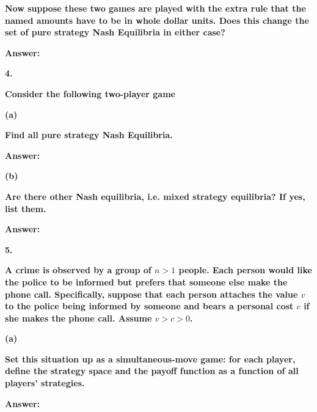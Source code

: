 \documentclass[letterpaper,11pt]{article}
\begin{document}
\textbf{Now suppose these two games are played with the extra rule that the named amounts have to be in whole dollar units. Does this change the set of pure strategy Nash Equilibria in either case?
}\par
\bigbreak
\begin{addmargin}[-0.5em]{0em}
\textbf{Answer: }\end{addmargin}





\begin{addmargin}[-2em]{0em} \large{\textbf{4. }}\end{addmargin}
\textbf{Consider the following two-player game}




\begin{addmargin}[-1.1em]{0em}
\textbf{(a)}\par\end{addmargin}
\textbf{Find all pure strategy Nash Equilibria.}
\bigbreak
\begin{addmargin}[-0.5em]{0em}
\textbf{Answer: }\end{addmargin}


\begin{addmargin}[-1.1em]{0em}
\textbf{(b)}\par\end{addmargin}
\textbf{Are there other Nash equilibria, i.e. mixed strategy equilibria? If yes, list them.
}\par
\bigbreak
\begin{addmargin}[-0.5em]{0em}
\textbf{Answer: }\end{addmargin}


\bigbreak

\begin{addmargin}[-2em]{0em} \large{\textbf{5. }}\end{addmargin}

\textbf{A crime is observed by a group of $n > 1$ people. Each person would like the police to be informed but prefers that someone else make the phone call. Specifically, suppose that each person attaches the value $v$ to the police being informed by someone and bears a personal cost $c$ if she makes the phone call. Assume $v > c > 0$.
}

\begin{addmargin}[-1.1em]{0em}
\textbf{(a)}\par\end{addmargin}
  \textbf{Set this situation up as a simultaneous-move game: for each player, define the strategy space and the payoff function as a function of all players’ strategies.
}\par
        \bigbreak
        \begin{addmargin}[-0.5em]{0em}
        \textbf{Answer: }\end{addmargin}
\end{document}
